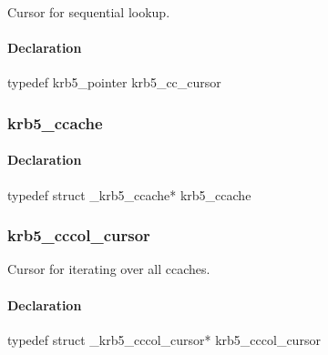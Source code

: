 \documentclass[letterpaper,10pt,english]{sphinxmanual}
\begin{document}
\begin{fulllineitems}
\label{appdev/refs/types/krb5_cc_cursor:krb5_cc_cursor}
\end{fulllineitems}


Cursor for sequential lookup.


\paragraph{Declaration}
\label{appdev/refs/types/krb5_cc_cursor:declaration}
typedef krb5\_pointer krb5\_cc\_cursor


\subsubsection{krb5\_ccache}
\label{appdev/refs/types/krb5_ccache:krb5-ccache-struct}\label{appdev/refs/types/krb5_ccache::doc}\label{appdev/refs/types/krb5_ccache:krb5-ccache}

\begin{fulllineitems}
\label{appdev/refs/types/krb5_ccache:krb5_ccache}
\end{fulllineitems}



\paragraph{Declaration}
\label{appdev/refs/types/krb5_ccache:declaration}
typedef struct \_krb5\_ccache* krb5\_ccache


\subsubsection{krb5\_cccol\_cursor}
\label{appdev/refs/types/krb5_cccol_cursor:krb5-cccol-cursor-struct}\label{appdev/refs/types/krb5_cccol_cursor::doc}\label{appdev/refs/types/krb5_cccol_cursor:krb5-cccol-cursor}

\begin{fulllineitems}
\label{appdev/refs/types/krb5_cccol_cursor:krb5_cccol_cursor}
\end{fulllineitems}


Cursor for iterating over all ccaches.


\paragraph{Declaration}
\label{appdev/refs/types/krb5_cccol_cursor:declaration}
typedef struct \_krb5\_cccol\_cursor* krb5\_cccol\_cursor
\end{document}
